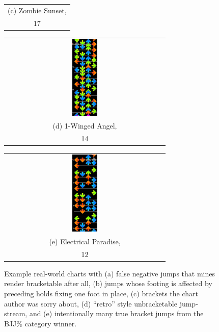 \documentclass[10pt]{sigplanconf}
\begin{document}
\begin{figure}[t]
\begin{center}
\begin{tabular}{c}
		\\
		(c) Zombie Sunset, \\ 17 \cite{zombie} %
	\end{tabular}
	\begin{tabular}{c}
		\includegraphics[width=0.16\textwidth]{disco-owa.png}
		\\
		(d) 1-Winged Angel, \\ 14 \cite{owa} %
	\end{tabular}
	\begin{tabular}{c}
		\includegraphics[width=0.16\textwidth]{disco-paradise.png}
		\\
		(e) Electrical Paradise, \\ 12 \cite{e-paradise} %
	\end{tabular}
	\end{center}
	\caption{Example real-world charts with
	(a) false negative jumps that mines render bracketable after all,
	(b) jumps whose footing is affected by preceding holds fixing one foot in place,
	(c) brackets the chart author was sorry about,
	(d) ``retro'' style unbracketable jump-stream, %
	and
	(e) intentionally many true bracket jumps from the BJJ\% category winner.}
	\label{fig:discussion}
\end{figure}
\end{document}
